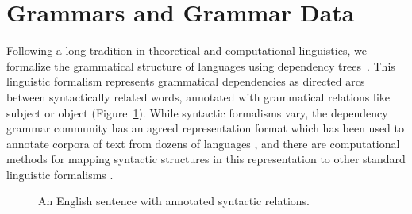 \documentclass[9pt,twocolumn,twoside,lineno]{pnas-new}
\newcommand{\key}[1]{\textbf{#1}}
\begin{document}





\section*{Grammars and Grammar Data}

Following a long tradition in theoretical and computational linguistics, we formalize  the grammatical structure of languages using dependency trees~\cite{hays1964dependency,melcuk1988dependency,corbett1993heads,tesniere2015elements}.
This linguistic formalism represents grammatical dependencies as directed arcs between syntactically related words, annotated with grammatical relations like subject or object (Figure~\ref{fig:sent-dep}).
While syntactic formalisms vary, the dependency grammar community has an agreed representation format  which has been used to  annotate corpora of text from dozens of languages \cite{ud2.1}, and there are 
computational methods for mapping syntactic structures in this representation to other standard linguistic formalisms \cite{boston2009dependency}.

\begin{figure}[ht]
    \centering
{
}
	\caption{An English sentence with annotated syntactic relations.}
	\label{fig:sent-dep}
\end{figure}
\end{document}
